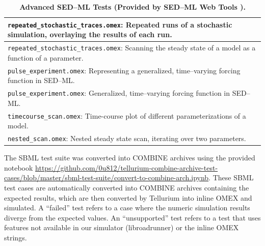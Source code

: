 \documentclass[10pt,letterpaper]{article}
\newlength\savedwidth
\newcommand\thickhline{\noalign{\global\savedwidth\arrayrulewidth\global\arrayrulewidth 2pt}%
\hline
\noalign{\global\arrayrulewidth\savedwidth}}
\begin{document}
\clearpage

\begin{table}[t]
\centering
\caption{
{\bf Advanced SED--ML Tests (Provided by SED--ML Web Tools \cite{bergmann2017sed}).} }
\begin{tabular}{p{12cm}}
\hline %
  \texttt{repeated\_stochastic\_traces.omex}: Repeated runs of a stochastic simulation, overlaying the results of each run. \\ \hline
  \texttt{repeated\_stochastic\_traces.omex}: Scanning the steady state of a model as a function of a parameter. \\ \hline
  \texttt{pulse\_experiment.omex}: Representing a generalized, time--varying forcing function in SED--ML. \\ \hline
  \texttt{pulse\_experiment.omex}: Generalized, time--varying forcing function in SED--ML. \\ \hline
  \texttt{timecourse\_scan.omex}: Time-course plot of different parameterizations of a model. \\ \hline
  \texttt{nested\_scan.omex}: Nested steady state scan, iterating over two parameters. \\ \hline
\end{tabular}
\begin{flushleft} The SBML test suite was converted into COMBINE archives using the provided notebook \href{https://github.com/0u812/tellurium-combine-archive-test-cases/blob/master/sbml-test-suite/convert-to-combine-arch.ipynb}{https://github.com/0u812/tellurium-combine-archive-test-cases/blob/master/sbml-test-suite/convert-to-combine-arch.ipynb}. These SBML test cases are automatically converted into COMBINE archives containing the expected results, which are then converted by Tellurium into inline OMEX and simulated. A ``failed'' test refers to a case where the numeric simulation results diverge from the expected values. An ``unsupported'' test refers to a test that uses features not available in our simulator (libroadrunner) or the inline OMEX strings.
\end{flushleft}
\label{swt-examples}
\end{table}

\clearpage
\end{document}
